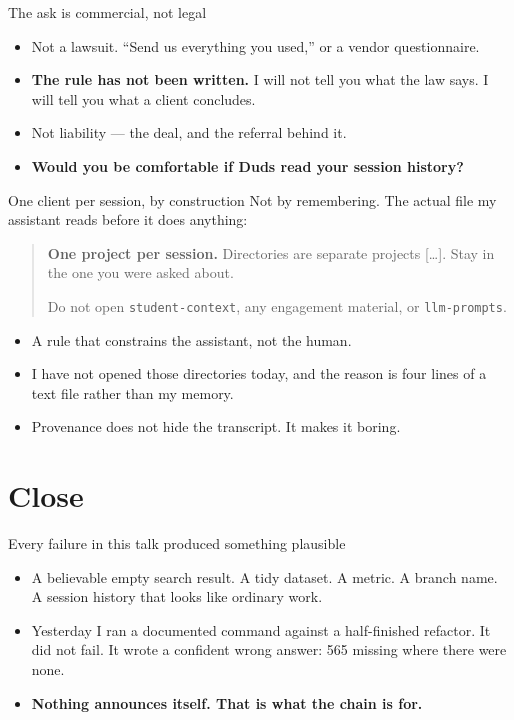 \documentclass[aspectratio=169,t]{beamer}
\begin{document}
\begin{frame}{The ask is commercial, not legal}
    \begin{itemize}
        \item Not a lawsuit. ``Send us everything you used,'' or a vendor
              questionnaire.
        \item \textbf{The rule has not been written.} I will not tell you what the
              law says. I will tell you what a client concludes.
        \item Not liability --- the deal, and the referral behind it.
        \item \textbf{Would you be comfortable if Duds read your session history?}
    \end{itemize}
\end{frame}

\begin{frame}{One client per session, by construction}
    Not by remembering. The actual file my assistant reads before it does anything:
    \begin{quote}\small
        \textbf{One project per session.} Directories are separate projects
        [\ldots]. Stay in the one you were asked about.

        Do not open \texttt{student-context}, any engagement material, or
        \texttt{llm-prompts}.
    \end{quote}
    \begin{itemize}
        \item A rule that constrains the assistant, not the human.
        \item I have not opened those directories today, and the reason is four
              lines of a text file rather than my memory.
        \item Provenance does not hide the transcript. It makes it boring.
    \end{itemize}
\end{frame}

\section{Close}

\begin{frame}{Every failure in this talk produced something plausible}
    \begin{itemize}
        \item A believable empty search result. A tidy dataset. A metric. A branch
              name. A session history that looks like ordinary work.
        \item Yesterday I ran a documented command against a half-finished
              refactor. It did not fail. It wrote a confident wrong answer:
              565 missing where there were none.
        \item \textbf{Nothing announces itself. That is what the chain is for.}
    \end{itemize}
\end{frame}
\end{document}
